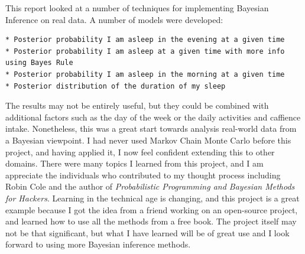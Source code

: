 \documentclass[12pt]{article}
\begin{document}
This report looked at a number of techniques for implementing Bayesian
Inference on real data. A number of models were developed:

\begin{verbatim}
* Posterior probability I am asleep in the evening at a given time
* Posterior probability I am asleep at a given time with more info using Bayes Rule
* Posterior probability I am asleep in the morning at a given time
* Posterior distribution of the duration of my sleep 
\end{verbatim}

The results may not be entirely useful, but they could be combined with
additional factors such as the day of the week or the daily activities
and caffience intake. Nonetheless, this was a great start towards
analysis real-world data from a Bayesian viewpoint. I had never used
Markov Chain Monte Carlo before this project, and having applied it, I
now feel confident extending this to other domains. There were many
topics I learned from this project, and I am appreciate the individuals
who contributed to my thought process including Robin Cole and the
author of \emph{Probabilistic Programming and Bayesian Methods for
Hackers}. Learning in the technical age is changing, and this project is
a great example because I got the idea from a friend working on an
open-source project, and learned how to use all the methods from a free
book. The project itself may not be that significant, but what I have
learned will be of great use and I look forward to using more Bayesian
inference methods.


    
    
    
    
\end{document}

